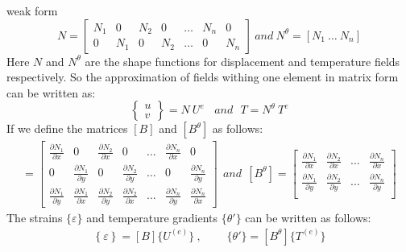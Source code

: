 \documentclass{beamer}
\begin{document}
\begin{frame}[t,fragile]{weak form}
    \tiny
         $$ N=\begin{bmatrix}N_1 &0&N_2 &0&\dots&N_n &0\\0&N_1 &0&N_2 &\dots&0&N_n \end{bmatrix}~and ~N^{\theta}=[N_1 ~\dots~N_n ] 
$$
Here $N$ and $N^{\theta}$ are the shape functions for displacement and temperature fields respectively. So the approximation of fields withing one element in matrix form can be written as:
$$ \begin{Bmatrix}u\\v\end{Bmatrix}=N\ U^e~ ~ ~ ~and ~ ~~ T=N^{\theta}\ T^e
$$
If we define the matrices $[B]$ and $[B^{\theta}]$ as follows:
    \begin{align}
    [B]=\begin{bmatrix}
        \frac{\partial N_1}{\partial x}&0&\frac{\partial N_2}{\partial x}&0&\dots&\frac{\partial N_n}{\partial x}&0\\
        0&\frac{\partial N_1}{\partial y}&0&\frac{\partial N_2}{\partial y}&\dots&0&\frac{\partial N_n}{\partial y}\\
\frac{\partial N_1}{\partial y}&\frac{\partial N_1}{\partial x}&
\frac{\partial N_2}{\partial y}&\frac{\partial N_2}{\partial x}&\dots&
\frac{\partial N_n}{\partial y}&\frac{\partial N_n}{\partial x}
    \end{bmatrix}~ ~ and ~ ~    [B^{\theta}]=\begin{bmatrix}
        \frac{\partial N_1}{\partial x}&\frac{\partial N_2}{\partial x}&\dots&\frac{\partial N_n}{\partial x}\\
        \frac{\partial N_1}{\partial y}&\frac{\partial N_2}{\partial y}&\dots&\frac{\partial N_n}{\partial y}\\
    \end{bmatrix}
    \end{align}
The strains $\{\varepsilon\}$ and temperature gradients $\{\theta'\}$ can be written as follows:
    \begin{align}
    \left\{ \varepsilon \right\}=\left[ B \right]\{ U^{(e)} \} ~ ,~ ~ ~ ~ ~ ~ ~ ~ ~  ~ \{\theta'\}=\left[ B^{\theta} \right]\{ T^{(e)} \} 
\end{align}   
\end{frame} 
\end{document}
